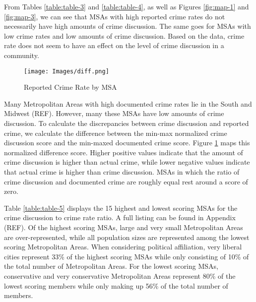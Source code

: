 \documentclass[12pt,oneside, letterpaper]{book}
\begin{document}
\par From Tables \ref{table:table-3} and \ref{table:table-4}, as well as Figures \ref{fig:map-1} and \ref{fig:map-3}, we can see that MSAs with high reported crime rates do not necessarily have high amounts of crime discussion. The same goes for MSAs with low crime rates and low amounts of crime discussion. Based on the data, crime rate does not seem to have an effect on the level of crime discussion in a community.

\begin{figure}[ht]
    \centering
    \texttt{[image: Images/diff.png]}
    \caption{Reported Crime Rate by MSA}
    \label{fig:map-4}
\end{figure}

\par Many Metropolitan Areas with high documented crime rates lie in the South and Midwest (REF). However, many these MSAs have low amounts of crime discussion. To calculate the discrepancies between crime discussion and reported crime, we calculate the difference between the min-max normalized crime discussion score and the min-maxed documented crime score. Figure \ref{fig:map-4} maps this normalized difference score. Higher positive values indicate that the amount of crime discussion is higher than actual crime, while lower negative values indicate that actual crime is higher than crime discussion. MSAs in which the ratio of crime discussion and documented crime are roughly equal rest around a score of zero.

\par Table \ref{table:table-5} displays the 15 highest and lowest scoring MSAs for the crime discussion to crime rate ratio. A full listing can be found in Appendix (REF). Of the highest scoring MSAs, large and very small Metropolitan Areas are over-represented, while all population sizes are represented among the lowest scoring Metropolitan Areas. When considering political affiliation, very liberal cities represent 33\% of the highest scoring MSAs while only consisting of 10\% of the total number of Metropolitan Areas. For the lowest scoring MSAs, conservative and very conservative Metropolitan Areas represent 80\% of the lowest scoring members while only making up 56\% of the total number of members.
\end{document}
